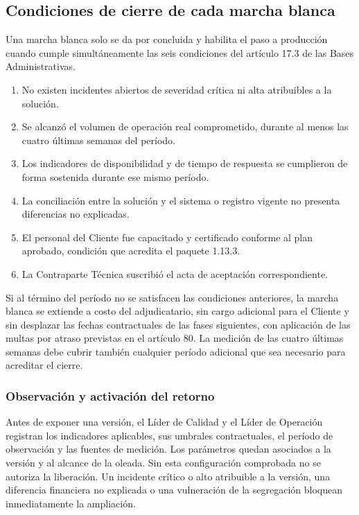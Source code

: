 \documentclass[11pt]{article}
\begin{document}
\subsection*{Condiciones de cierre de cada marcha blanca}

Una marcha blanca solo se da por concluida y habilita el paso a producción cuando cumple simultáneamente las seis condiciones del artículo 17.3 de las Bases Administrativas.

\begin{enumerate}
\item No existen incidentes abiertos de severidad crítica ni alta atribuibles a la solución.
\item Se alcanzó el volumen de operación real comprometido, durante al menos las cuatro últimas semanas del período.
\item Los indicadores de disponibilidad y de tiempo de respuesta se cumplieron de forma sostenida durante ese mismo período.
\item La conciliación entre la solución y el sistema o registro vigente no presenta diferencias no explicadas.
\item El personal del Cliente fue capacitado y certificado conforme al plan aprobado, condición que acredita el paquete 1.13.3.
\item La Contraparte Técnica suscribió el acta de aceptación correspondiente.
\end{enumerate}

Si al término del período no se satisfacen las condiciones anteriores, la marcha blanca se extiende a costo del adjudicatario, sin cargo adicional para el Cliente y sin desplazar las fechas contractuales de las fases siguientes, con aplicación de las multas por atraso previstas en el artículo 80. La medición de las cuatro últimas semanas debe cubrir también cualquier período adicional que sea necesario para acreditar el cierre.

\subsubsection*{Observación y activación del retorno}

Antes de exponer una versión, el Líder de Calidad y el Líder de Operación registran los indicadores aplicables, sus umbrales contractuales, el período de observación y las fuentes de medición. Los parámetros quedan asociados a la versión y al alcance de la oleada. Sin esta configuración comprobada no se autoriza la liberación. Un incidente crítico o alto atribuible a la versión, una diferencia financiera no explicada o una vulneración de la segregación bloquean inmediatamente la ampliación.
\end{document}
